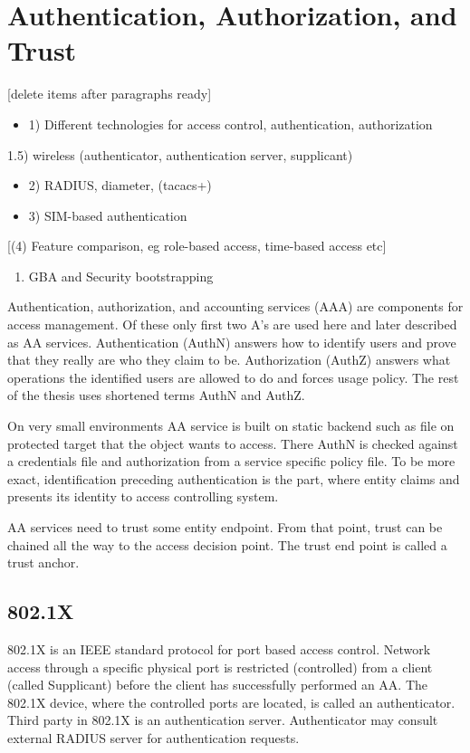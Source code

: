 \documentclass[12pt,a4paper,english]{tutthesis}
\begin{document}
\chapter{Authentication, Authorization, and Trust}
\label{sec-2}

[delete items after paragraphs ready]
\begin{itemize}
\item 1) Different technologies for access control, authentication,
authorization
\end{itemize}
1.5) wireless (authenticator, authentication server, supplicant)
\begin{itemize}
\item 2) RADIUS, diameter, (tacacs+)
\item 3) SIM-based authentication
\end{itemize}
[(4) Feature comparison, eg role-based access, time-based access etc]
\begin{enumerate}
\item GBA and Security bootstrapping
\end{enumerate}

Authentication, authorization, and accounting services (AAA) are
components for access management. Of these only first two A's are used
here and later described as AA services. Authentication (AuthN)
answers how to identify users and prove that they really are
who they claim to be. Authorization (AuthZ) answers what operations
the identified users are allowed to do and forces usage policy. The rest of the thesis uses
shortened terms AuthN and AuthZ.

On very small environments AA service is built on static backend such
as file on protected target that the object wants to access. There AuthN
is checked against a credentials file and authorization from a service
specific policy file. 
To be more exact, identification preceding authentication is the part,
where entity claims and presents its identity to 
access controlling system.

AA services need to trust some entity endpoint. From that point, trust
can be chained all the way to the access decision point. The trust end
point is called a trust anchor.


\section{802.1X}
\label{sec-2-1}

802.1X \cite{8021X} is an IEEE standard protocol for port based access
control. 
 Network access through a specific physical port is
restricted (controlled) from a client (called Supplicant) before
the client has successfully performed an AA. The 802.1X device, where the  controlled ports
are located, is called an authenticator. Third party in 802.1X is an
authentication server. Authenticator may consult external RADIUS
server for authentication requests. 
\end{document}
